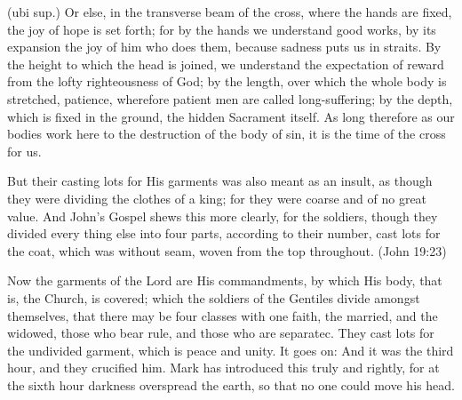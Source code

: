  (ubi sup.) Or else, in the transverse beam of the cross, where the hands are fixed, the joy of hope is set forth; for by the hands we understand good works, by its expansion the joy of him who does them, because sadness puts us in straits. By the height to which the head is joined, we understand the expectation of reward from the lofty righteousness of God; by the length, over which the whole body is stretched, patience, wherefore patient men are called long-suffering; by the depth, which is fixed in the ground, the hidden Sacrament itself. As long therefore as our bodies work here to the destruction of the body of sin, it is the time of the cross for us.

 But their casting lots for His garments was also meant as an insult, as though they were dividing the clothes of a king; for they were coarse and of no great value. And John’s Gospel shews this more clearly, for the soldiers, though they divided every thing else into four parts, according to their number, cast lots for the coat, which was without seam, woven from the top throughout. (John 19:23)

 Now the garments of the Lord are His commandments, by which His body, that is, the Church, is covered; which the soldiers of the Gentiles divide amongst themselves, that there may be four classes with one faith, the married, and the widowed, those who bear rule, and those who are separatec. They cast lots for the undivided garment, which is peace and unity. It goes on: And it was the third hour, and they crucified him. Mark has introduced this truly and rightly, for at the sixth hour darkness overspread the earth, so that no one could move his head.

